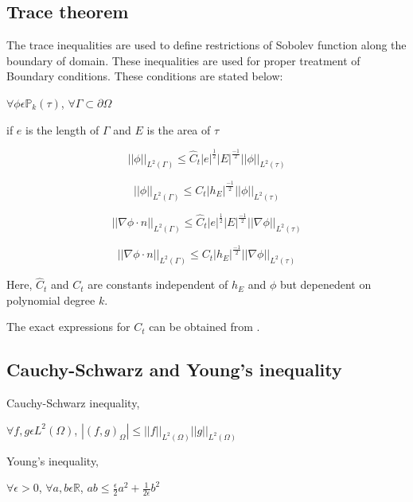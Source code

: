 \documentclass[a4paper,12pt]{book}
\begin{document}
\subsection{Trace theorem} \cite{riviere}

The trace inequalities are used to define restrictions of Sobolev function along the boundary of domain. These inequalities are used for proper treatment of Boundary conditions. These conditions are stated below:

$\forall \phi \epsilon \mathbb{P}_k(\tau)$, $\forall \Gamma \subset \partial \Omega$

if $e$ is the length of $\Gamma$ and $E$ is the area of $\tau$

\begin{equation}
||\phi||_{L^2(\Gamma)} \leq \hat{C}_t |e|^{\frac{1}{2}} |E|^{\frac{-1}{2}} ||\phi||_{L^2(\tau)}
\end{equation}

\begin{equation}
||\phi||_{L^2(\Gamma)} \leq {C}_t |h_E|^{\frac{-1}{2}} ||\phi||_{L^2(\tau)}
\end{equation}

\begin{equation}
||\nabla \phi \cdot n||_{L^2(\Gamma)} \leq \hat{C}_t |e|^{\frac{1}{2}} |E|^{\frac{-1}{2}} ||\nabla \phi||_{L^2(\tau)}
\end{equation}

\begin{equation}
||\nabla \phi \cdot n||_{L^2(\Gamma)} \leq {C}_t |h_E|^{\frac{-1}{2}} ||\nabla \phi||_{L^2(\tau)}
\end{equation}

Here, $\hat{C}_t$ and ${C}_t$ are constants independent of $h_E$ and $\phi$ but depenedent on polynomial degree $k$.

The exact expressions for $C_t$ can be obtained from \cite{warburton}.

\subsection{Cauchy-Schwarz and Young's inequality}\cite{riviere}

Cauchy-Schwarz inequality,\\
\begin{center}
$\forall f,g \epsilon L^2(\Omega)$, $|(f,g)_{\Omega}| \leq ||f||_{L^2(\Omega)} ||g||_{L^2(\Omega)}$ \\
\end{center}

Young's inequality,\\
\begin{center}
$\forall \epsilon > 0$, $\forall a,b \epsilon \mathbb{R}$, $ab \leq \frac{\epsilon}{2}a^2 + \frac{1}{2 \epsilon}b^2$\\
\end{center}



\end{document}
